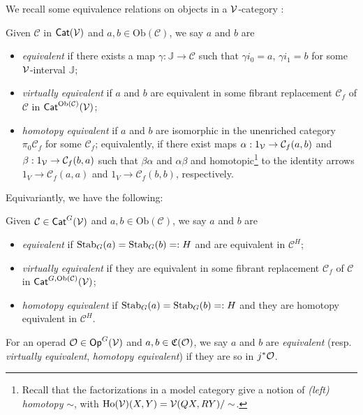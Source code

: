 \documentclass[a4paper,10pt
,draft
]{article}%
\newcommand{\J}{\mathbb J}
\renewcommand{\1}{\ensuremath{\mathbb{id}}}
\begin{document}
We recall some equivalence relations on objects in a $\mathcal V$-category \cite{Cav14, BM13}:
\begin{definition}
      Given $\mathcal{C}$ in  $\mathsf{Cat}(\mathcal V)$ and $a,b\in\mathrm{Ob}(\mathcal C)$, we say $a$ and $b$ are
      \begin{itemize}
      \item {\em equivalent} if there exists a map $\gamma: \J \to \mathcal C$ such that
            $\gamma i_0 = a$, $\gamma i_1 = b$
            for some $\mathcal V$-interval $\J$;
      \item {\em virtually equivalent} if $a$ and $b$ are equivalent in some fibrant replacement
            $\mathcal C_f$ of $\mathcal C$ in $\mathsf{Cat}^{\mathrm{Ob}(\mathcal C)}(\mathcal V)$;
      \item {\em homotopy equivalent} if $a$ and $b$ are isomorphic in the unenriched category $\pi_0 \mathcal C_f$
            for some $\mathcal C_f$;
            equivalently, if there exist maps
            $\alpha: 1_{\mathcal V} \to \mathcal C_f(a,b)$ and $\beta: 1_{\mathcal V}\to \mathcal C_f(b,a)$ such that
            $\beta\alpha$ and $\alpha\beta$ and homotopic\footnote{
              Recall that the factorizations in a model category give a notion of \textit{(left) homotopy} $\sim$,
              with $\operatorname{Ho}(\mathcal V)(X,Y) = \mathcal V(QX,RY)/\sim$.}
            to the identity arrows
            $1_V\to \mathcal C_f(a,a)$ and $1_V \to \mathcal C_f(b,b)$, respectively.
      \end{itemize}
\end{definition}

Equivariantly, we have the following:
\begin{definition}
      Given $\mathcal{C}\in \mathsf{Cat}^G(\mathcal V)$ and $a,b\in \mathrm{Ob}(\mathcal{C})$, we say $a$ and $b$ are
      \begin{itemize}
      \item {\em equivalent} if $\mathrm{Stab}_G(a) = \mathrm{Stab}_G(b) =: H$ and are equivalent in $\mathcal{C}^H$;
      \item {\em virtually equivalent} if they are equivalent in some fibrant replacement
            $\mathcal{C}_f$ of $\mathcal{C}$ in $\mathsf{Cat}^{G, \mathrm{Ob}(\mathcal C)}(\mathcal V)$;
      \item {\em homotopy equivalent} if $\mathrm{Stab}_G(a) = \mathrm{Stab}_G(b) =: H$ and they are homotopy equivalent in $\mathcal{C}^H$. 
      \end{itemize}
      For an operad $\mathcal{O}\in \mathsf{Op}^G(\mathcal V)$ and $a,b\in \mathfrak C(\mathcal{O})$, we say $a$ and $b$ are
      {\em equivalent} (resp. {\em virtually equivalent}, {\em homotopy equivalent}) if they are so in $j^*\mathcal{O}$. 
\end{definition}
\end{document}
